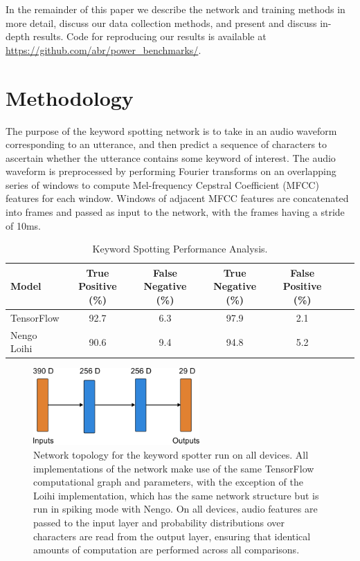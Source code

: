 \documentclass{article}
\begin{document}
In the remainder of this paper we describe the network and training methods in more detail, discuss our data collection methods, and present and discuss in-depth results. Code for reproducing our results is available at \url{https://github.com/abr/power\_benchmarks/}.

\section{Methodology}


The purpose of the keyword spotting network is to take in an audio waveform corresponding to an utterance, and then predict a sequence of characters to ascertain whether the utterance contains some keyword of interest. The audio waveform is preprocessed by performing Fourier transforms on an overlapping series of windows to compute Mel-frequency Cepstral Coefficient (MFCC) features for each window. Windows of adjacent MFCC features are concatenated into frames and passed as input to the network, with the frames having a stride of 10ms.  

\begin{table}[t!]
\caption{Keyword Spotting Performance Analysis.} 
\vskip 0.15in
\begin{center}
\begin{small}
\begin{sc}
\begin{tabular}{lcccccc}
\hline
\abovespace\belowspace
Model & True Positive (\%) & False Negative (\%) & True Negative (\%) & False Positive (\%) \\
\hline
\abovespace
TensorFlow & 92.7 & 6.3 & 97.9 & 2.1 \\   
\belowspace
Nengo Loihi & 90.6 & 9.4 & 94.8 & 5.2 \\

\hline
\end{tabular}
\end{sc}
\end{small}
\end{center}
\vskip -0.1in
\label{acc-table}
\end{table}


\begin{figure}[ht!]
\centering
    \includegraphics[width=2.5in]{./figures/network.png}
    \caption{Network topology for the keyword spotter run on all devices. All implementations of the network make use of the same TensorFlow computational graph and parameters, with the exception of the Loihi implementation, which has the same network structure but is run in spiking mode with Nengo. On all devices, audio features are passed to the input layer and probability distributions over characters are read from the output layer, ensuring that identical amounts of computation are performed across all comparisons.}
\label{network_fig}
\end{figure}
\end{document}
